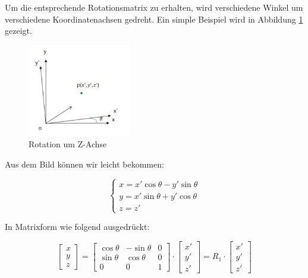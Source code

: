 Um die entsprechende Rotationsmatrix zu erhalten, wird verschiedene Winkel um verschiedene Koordinatenachsen gedreht. Ein simple Beispiel wird in Abbildung \ref{fig:rotation} gezeigt.

\begin{figure}[H]
 \centering 
 \includegraphics[keepaspectratio,width=0.4\textwidth]{images/4_ZweiteErfahrung/Kamera/rotationsmatrix.pdf}
 \caption{Rotation um Z-Achse}
 \label{fig:rotation}
\end{figure} 

Aus dem Bild können wir leicht bekommen:

\begin{equation}
   \begin{cases} 
	x = x'\cos\theta - y'\sin\theta \\	
	y = x'\sin\theta + y'\cos\theta \\
	z = z'
	\end{cases}
\end{equation}

In Matrixform wie folgend ausgedrückt:

\begin{equation}
   \begin{bmatrix}
	x \\  
	y \\
	z
	\end{bmatrix} = \begin{bmatrix}
	\cos\theta & -\sin\theta & 0	\\
	\sin\theta & \cos\theta  & 0	\\
	0    	   & 0           & 1	
	\end{bmatrix} \cdot \begin{bmatrix}
	x' \\  
	y' \\
	z'
	\end{bmatrix}= R_1 \cdot \begin{bmatrix}
	x' \\  
	y' \\
	z'
	\end{bmatrix}
\end{equation}

